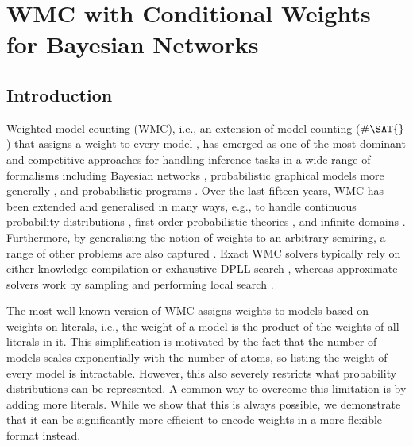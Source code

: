 \chapter{WMC with Conditional Weights for Bayesian Networks} \label{chapter:wmc1}

\section{Introduction}

Weighted model counting (WMC), i.e., an extension of model counting ($\#\SAT{}$)
that assigns a weight to every model \citep{DBLP:conf/aaai/SangBK05}, has
emerged as one of the most dominant and competitive approaches for handling
inference tasks in a wide range of formalisms including Bayesian networks
\citep{DBLP:conf/aaai/SangBK05,DBLP:books/daglib/0024906}, probabilistic
graphical models more generally \citep{DBLP:conf/ecsqaru/ChoiKD13}, and
probabilistic programs
\citep{DBLP:journals/tplp/FierensBRSGTJR15,DBLP:journals/corr/abs-2005-09089}.
Over the last fifteen years, WMC has been extended and generalised in many ways,
e.g., to handle continuous probability distributions
\citep{DBLP:conf/ijcai/BellePB15}, first-order probabilistic theories
\citep{DBLP:conf/ijcai/BroeckTMDR11,DBLP:journals/cacm/GogateD16}, and infinite
domains \citep{DBLP:conf/aaai/Belle17}. Furthermore, by generalising the notion
of weights to an arbitrary semiring, a range of other problems are also captured
\citep{DBLP:journals/japll/KimmigBR17}. Exact WMC solvers typically rely on
either knowledge compilation
\citep{DBLP:conf/ijcai/OztokD15,DBLP:conf/ijcai/LagniezM17} or exhaustive DPLL
search \citep{DBLP:conf/aaai/SangBK05}, whereas approximate solvers work by
sampling \citep{DBLP:conf/aaai/ChakrabortyFMSV14} and performing local search
\citep{DBLP:conf/sat/WeiS05}.

The most well-known version of WMC assigns weights to models based on
weights on literals, i.e., the weight of a model is the product of the weights
of all literals in it. This simplification is motivated by the fact that the
number of models scales exponentially with the number of atoms, so listing the
weight of every model is intractable. However, this also severely restricts what
probability distributions can be represented. A common way to overcome this
limitation is by adding more literals. While we show that this is always
possible, we demonstrate that it can be significantly more efficient to
encode weights in a more flexible format instead.

